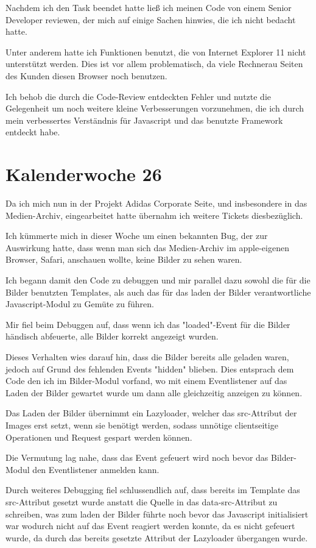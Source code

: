 \documentclass[11pt]{article} %
\begin{document}
Nachdem ich den Task beendet hatte ließ ich meinen Code von einem Senior Developer reviewen, der mich auf einige Sachen hinwies, die ich nicht bedacht hatte.

Unter anderem hatte ich Funktionen benutzt, die von Internet Explorer 11 nicht unterstützt werden.
Dies ist vor allem problematisch, da viele Rechnerau Seiten des Kunden diesen Browser noch benutzen.

Ich behob die durch die Code-Review entdeckten Fehler und nutzte die Gelegenheit um noch weitere kleine Verbesserungen vorzunehmen, die ich durch mein verbessertes Verständnis für Javascript und das benutzte Framework entdeckt habe.

\section{Kalenderwoche 26} \label{sec:kw26}

Da ich mich nun in der Projekt Adidas Corporate Seite, und insbesondere in das Medien-Archiv, eingearbeitet hatte übernahm ich weitere Tickets diesbezüglich.

Ich kümmerte mich in dieser Woche um einen bekannten Bug, der zur Auswirkung hatte, dass wenn man sich das Medien-Archiv im apple-eigenen Browser, Safari, anschauen wollte, keine Bilder zu sehen waren.

Ich begann damit den Code zu debuggen und mir parallel dazu sowohl die für die Bilder benutzten Templates, als auch das für das laden der Bilder verantwortliche Javascript-Modul zu Gemüte zu führen.

Mir fiel beim Debuggen auf, dass wenn ich das "loaded"-Event für die Bilder händisch abfeuerte, alle Bilder korrekt angezeigt wurden.

Dieses Verhalten wies darauf hin, dass die Bilder bereits alle geladen waren, jedoch auf Grund des fehlenden Events "hidden" blieben. Dies entsprach dem Code den ich im Bilder-Modul vorfand, wo mit einem Eventlistener auf das Laden der Bilder gewartet wurde um dann alle gleichzeitig anzeigen zu können.

Das Laden der Bilder übernimmt ein Lazyloader, welcher das src-Attribut der Images erst setzt, wenn sie benötigt werden, sodass unnötige clientseitige Operationen und Request gespart werden können.

Die Vermutung lag nahe, dass das Event gefeuert wird noch bevor das Bilder-Modul den Eventlistener anmelden kann.

Durch weiteres Debugging fiel schlussendlich auf, dass bereits im Template das src-Attribut gesetzt wurde anstatt die Quelle in das data-src-Attribut zu schreiben, was zum laden der Bilder führte noch bevor das Javascript initialisiert war wodurch nicht auf das Event reagiert werden konnte, da es nicht gefeuert wurde, da durch das bereits gesetzte Attribut der Lazyloader übergangen wurde.
\end{document}
